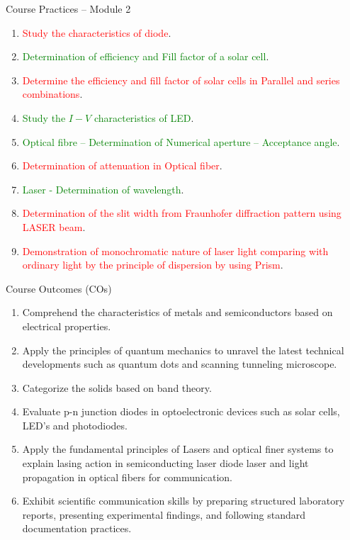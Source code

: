 \begin{frame}{Course Practices -- Module 2}
	\begin{enumerate}
		\item \textcolor{red}{Study the characteristics of diode}.
		\item \textcolor{green}{Determination of efficiency and Fill factor of a solar cell}.
		\item \textcolor{red}{Determine the efficiency and fill factor of solar cells in Parallel and series combinations}.
		\item \textcolor{green}{Study the \(I-V\) characteristics of LED}.
		\item \textcolor{green}{Optical fibre – Determination of Numerical aperture – Acceptance angle}.
		\item \textcolor{red}{Determination of attenuation in Optical fiber}.
		\item \textcolor{green}{Laser - Determination of wavelength}.
		\item \textcolor{red}{Determination of the slit width from Fraunhofer diffraction pattern using LASER beam}.
		\item \textcolor{red}{Demonstration of monochromatic nature of laser light comparing with ordinary light by the principle of dispersion by using Prism}.
	\end{enumerate}
\end{frame}
%
%
\begin{frame}{Course Outcomes (COs)}
	\begin{enumerate}
		\item Comprehend the characteristics of metals and semiconductors based on electrical properties.
		\item Apply the principles of quantum mechanics to unravel the latest technical developments such as quantum dots and scanning tunneling microscope.
		\item Categorize the solids based on band theory.
		\item  Evaluate p-n junction diodes in optoelectronic devices such as solar cells, LED’s and photodiodes.
		\item Apply the fundamental principles of Lasers and optical finer systems to explain lasing action in semiconducting laser diode laser and light propagation in optical fibers for communication.
		\item Exhibit scientific communication skills by preparing structured laboratory reports, presenting experimental findings, and following standard documentation practices.
	\end{enumerate}
\end{frame}

